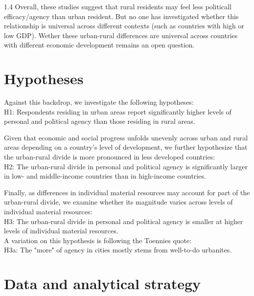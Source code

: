 \documentclass[10pt, letterpaper]{article}
\begin{document}
\begin{spacing}{1.4}
Overall, these studies suggest that rural residents may feel less politicall
efficacy/agency than urban resident. %
But no one has investigated whether this relationship is universal across
 different contexts (such as countries with high or low GDP).
Wether these urban-rural differences are universal across countries with
different economic development remains an open question.


\section{Hypotheses}


Against this backdrop, we investigate the following hypotheses:\\
H1: Respondents residing in urban areas report significantly higher levels of personal and political agency than those residing in rural areas.

Given that economic and social progress unfolds unevenly across urban and rural areas depending on a country's level of development, we further hypothesize that the urban-rural divide is more pronounced in less developed countries:\\
H2: The urban-rural divide in personal and political agency is significantly larger in low- and middle-income countries than in high-income countries.

Finally, as differences in individual material resources may account for part of the urban-rural divide, we examine whether its magnitude varies across levels of individual material resources:\\
H3: The urban-rural divide in personal and political agency is smaller at higher
levels of individual material resources.\\ A variation on this hypothesis is following the Toennies quote:\\
H3a: The "more" of agency in cities mostly stems from well-to-do urbanites. 



\section{Data and analytical strategy}



\end{spacing}
\end{document}
